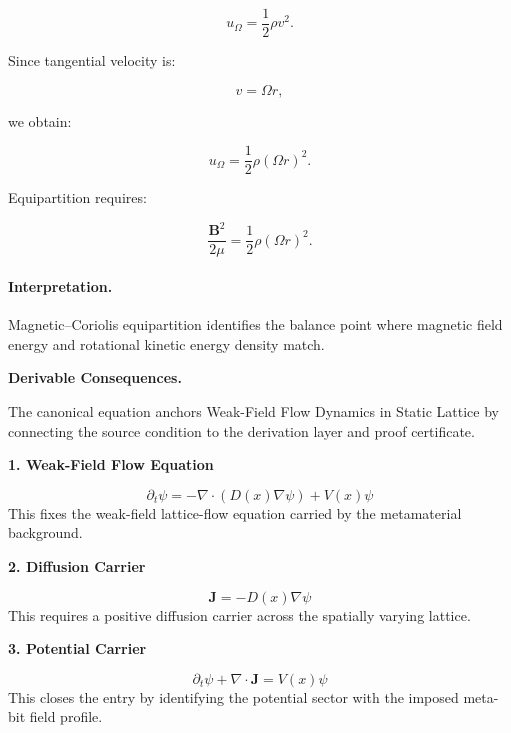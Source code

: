 \begin{equation}
u_{\Omega}
=
\frac{1}{2}\rho v^2 .
\end{equation}

Since tangential velocity is:

\begin{equation}
v=\Omega r,
\end{equation}

we obtain:

\begin{equation}
u_{\Omega}
=
\frac{1}{2}\rho(\Omega r)^2 .
\end{equation}

Equipartition requires:

\begin{equation}
\boxed{
\frac{\mathbf{B}^2}{2\mu}
=
\frac{1}{2}\rho(\Omega r)^2 .
}
\end{equation}

\paragraph{Interpretation.}
Magnetic--Coriolis equipartition identifies the balance point where magnetic field energy and rotational kinetic energy density match.

\par\vspace{0.35em}
\noindent\textbf{Derivable Consequences.}\quad
\begingroup
\footnotesize
\raggedright
The canonical equation anchors Weak-Field Flow Dynamics in Static Lattice by connecting the source condition to the derivation layer and proof certificate.
\par\endgroup

\noindent\textbf{1. Weak-Field Flow Equation}\par
\[
\partial_t\psi=-\nabla\cdot\!\left(D(x)\nabla\psi\right)+V(x)\psi
\]
\noindent This fixes the weak-field lattice-flow equation carried by the metamaterial background.\par
\noindent\textbf{2. Diffusion Carrier}\par
\[
\mathbf{J}=-D(x)\nabla\psi
\]
\noindent This requires a positive diffusion carrier across the spatially varying lattice.\par
\noindent\textbf{3. Potential Carrier}\par
\[
\partial_t\psi+\nabla\cdot\mathbf{J}=V(x)\psi
\]
\noindent This closes the entry by identifying the potential sector with the imposed meta-bit field profile.\par

